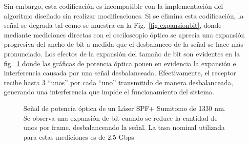 Sin embargo, esta codificación es incompatible con la implementación del algoritmo diseñado sin realizar modificaciones. Si se elimina esta codificación, la señal se degrada tal como se muestra en la Fig.~\ref{fig:expansionbit}, donde mediante mediciones directas con el osciloscopio óptico se aprecia una expansión progresiva del ancho de bit a medida que el desbalanceo de la señal se hace más pronunciado. Los efectos de la expansión del tamaño de bit son evidentes en la fig.~\ref{fig:ImgExpansion} donde las gráficas de potencia óptica ponen en evidencia la expansión e interferencia causada por una señal desbalanceada.
Efectivamente, el receptor recibe hasta 3 ``unos'' por cada ``uno'' transmitido de manera desbalanceada, generando una interferencia que impide el funcionamiento del sistema.


\begin{figure}[!t]
   \centering
   \qquad
   \qquad
  \caption {Señal de potencia óptica de un Láser SPF+ Sumitomo de 1330 nm. Se observa una expansión de bit cuando se reduce la cantidad de unos por frame, desbalanceando la señal. La tasa nominal utilizada para estas mediciones es de 2.5 Gbps}
  \label{fig:ImgExpansion}
\end{figure}

